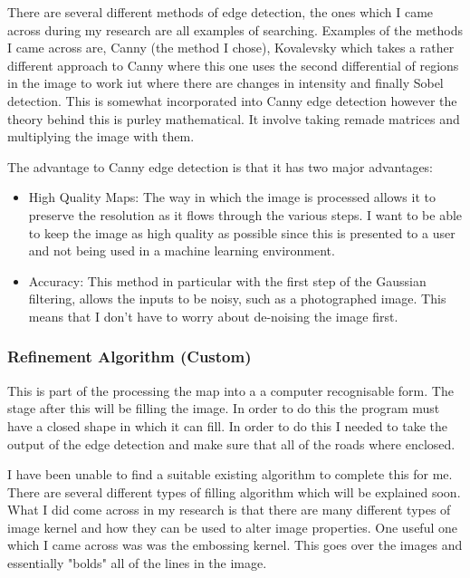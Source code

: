 \begin{FlushLeft}
    There are several different methods of edge detection, the ones which I came across during my research are all examples of searching. Examples of the methods I came across are, Canny (the method I chose), Kovalevsky which takes a rather different approach to Canny where this one uses the second differential of regions in the image to work iut where there are changes in intensity and finally Sobel detection. This is somewhat incorporated into Canny edge detection however the theory behind this is purley mathematical. It involve taking remade matrices and multiplying the image with them. \\ \bk

    The advantage to Canny edge detection is that it has two major advantages:
    \begin{itemize}
        \item High Quality Maps: The way in which the image is processed allows it to preserve the resolution as it flows through the various steps. I want to be able to keep the image as high quality as possible since this is presented to a user and not being used in a machine learning environment.
        \item Accuracy: This method in particular with the first step of the Gaussian filtering, allows the inputs to be noisy, such as a photographed image. This means that I don't have to worry about de-noising the image first. 
    \end{itemize}

    \bk

    \subsubsection{Refinement Algorithm (Custom)}
    This is part of the processing the map into a a computer recognisable form. The stage after this will be filling the image. In order to do this the program must have a closed shape in which it can fill. In order to do this I needed to take the output of the edge detection and make sure that all of the roads where enclosed. \\ \bk

    I have been unable to find a suitable existing algorithm to complete this for me. There are several different types of filling algorithm which will be explained soon. What I did come across in my research is that there are many different types of image kernel and how they can be used to alter image properties. One useful one which I came across was was the embossing kernel. This goes over the images and essentially "bolds" all of the lines in the image. \\ \bk


\end{FlushLeft}
